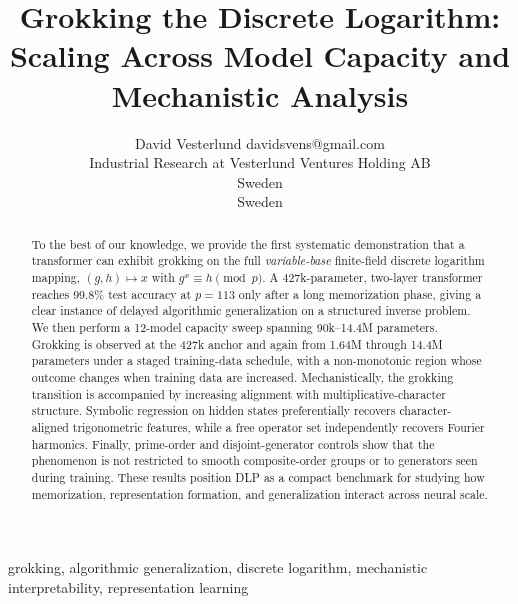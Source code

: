 \documentclass[twoside,11pt]{article}
\begin{document}
\title{Grokking the Discrete Logarithm: Scaling Across Model Capacity and Mechanistic Analysis}

\author{\name David Vesterlund \email davidsvens@gmail.com \\
\addr Industrial Research at Vesterlund Ventures Holding AB\\
Sweden\\
Sweden}

\maketitle

\begin{abstract}%
To the best of our knowledge, we provide the first systematic demonstration that a transformer can exhibit grokking on the full \emph{variable-base} finite-field discrete logarithm mapping, $(g,h)\mapsto x$ with $g^x\equiv h\pmod p$. A 427k-parameter, two-layer transformer reaches 99.8\% test accuracy at $p=113$ only after a long memorization phase, giving a clear instance of delayed algorithmic generalization on a structured inverse problem. We then perform a 12-model capacity sweep spanning 90k--14.4M parameters. Grokking is observed at the 427k anchor and again from 1.64M through 14.4M parameters under a staged training-data schedule, with a non-monotonic region whose outcome changes when training data are increased. Mechanistically, the grokking transition is accompanied by increasing alignment with multiplicative-character structure. Symbolic regression on hidden states preferentially recovers character-aligned trigonometric features, while a free operator set independently recovers Fourier harmonics. Finally, prime-order and disjoint-generator controls show that the phenomenon is not restricted to smooth composite-order groups or to generators seen during training. These results position DLP as a compact benchmark for studying how memorization, representation formation, and generalization interact across neural scale.
\end{abstract}

\begin{keywords}
grokking, algorithmic generalization, discrete logarithm, mechanistic interpretability, representation learning
\end{keywords}
\end{document}
